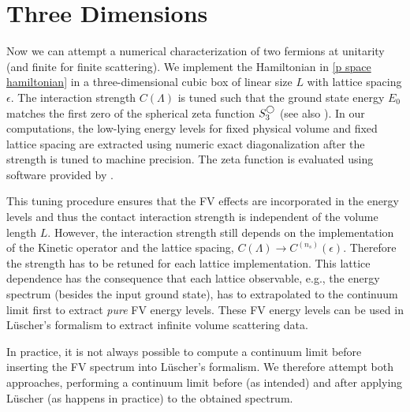 \section{Three Dimensions}\label{sec:3D}


Now we can attempt a numerical characterization of two fermions at unitarity (and finite for finite scattering).
We implement the Hamiltonian in \eqref{p space hamiltonian} in a three-dimensional cubic box of linear size $L$ with lattice spacing $\epsilon$.
The interaction strength $C(\Lambda)$ is tuned such that the ground state energy $E_0$ matches the first zero of the spherical zeta function $S^{\bigcirc}_3$ (see also ).
In our computations, the low-lying energy levels for fixed physical volume and fixed lattice spacing are extracted using numeric exact diagonalization after the strength is tuned to machine precision.
The zeta function is evaluated using software provided by .

This tuning procedure ensures that the FV effects are incorporated in the energy levels and thus the contact interaction strength is independent of the volume length $L$.
However, the interaction strength still depends on the implementation of the Kinetic operator and the lattice spacing, $C(\Lambda)\to C^{(n_s)}(\epsilon)$.
Therefore the strength has to be retuned for each lattice implementation.
This lattice dependence has the consequence that each lattice observable, e.g., the energy spectrum (besides the input ground state), has to extrapolated to the continuum limit first to extract \textit{pure} FV energy levels.
These FV energy levels can be used in Lüscher's formalism to extract infinite volume scattering data.

In practice, it is not always possible to compute a continuum limit before inserting the FV spectrum into Lüscher's formalism.
We therefore attempt both approaches, performing a continuum limit before (as intended) and after applying Lüscher (as happens in practice) to the obtained spectrum.



